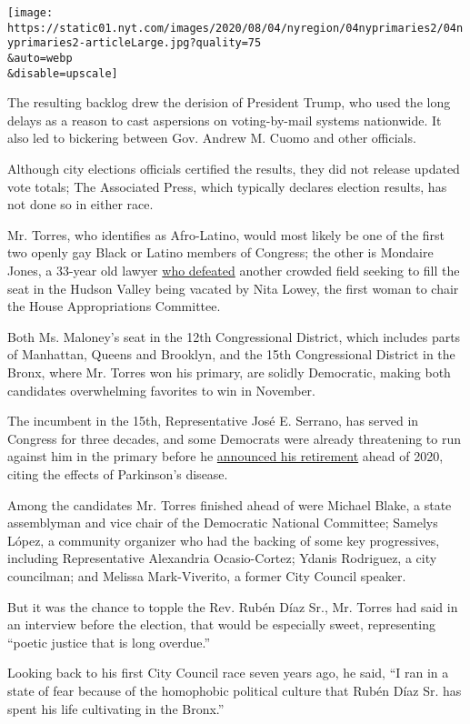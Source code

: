\texttt{[image: https://static01.nyt.com/images/2020/08/04/nyregion/04nyprimaries2/04nyprimaries2-articleLarge.jpg?quality=75\\\&auto=webp\\\&disable=upscale]}

The resulting backlog drew the derision of President Trump, who used the
long delays as a reason to cast aspersions on voting-by-mail systems
nationwide. It also led to bickering between Gov. Andrew M. Cuomo and
other officials.

Although city elections officials certified the results, they did not
release updated vote totals; The Associated Press, which typically
declares election results, has not done so in either race.

Mr. Torres, who identifies as Afro-Latino, would most likely be one of
the first two openly gay Black or Latino members of Congress; the other
is Mondaire Jones, a 33-year old lawyer
\href{https://www.nytimes.com/2020/07/14/nyregion/mondaire-jones-house-primary.html}{who
defeated} another crowded field seeking to fill the seat in the Hudson
Valley being vacated by Nita Lowey, the first woman to chair the House
Appropriations Committee.

Both Ms. Maloney's seat in the 12th Congressional District, which
includes parts of Manhattan, Queens and Brooklyn, and the 15th
Congressional District in the Bronx, where Mr. Torres won his primary,
are solidly Democratic, making both candidates overwhelming favorites to
win in November.

The incumbent in the 15th, Representative José E. Serrano, has served in
Congress for three decades, and some Democrats were already threatening
to run against him in the primary before he
\href{https://www.nytimes.com/2019/03/25/nyregion/jose-serrano-parkinsons-retire.html}{announced
his retirement} ahead of 2020, citing the effects of Parkinson's
disease.

Among the candidates Mr. Torres finished ahead of were Michael Blake, a
state assemblyman and vice chair of the Democratic National Committee;
Samelys López, a community organizer who had the backing of some key
progressives, including Representative Alexandria Ocasio-Cortez; Ydanis
Rodriguez, a city councilman; and Melissa Mark-Viverito, a former City
Council speaker.

But it was the chance to topple the Rev. Rubén Díaz Sr., Mr. Torres had
said in an interview before the election, that would be especially
sweet, representing ``poetic justice that is long overdue.''

Looking back to his first City Council race seven years ago, he said,
``I ran in a state of fear because of the homophobic political culture
that Rubén Díaz Sr. has spent his life cultivating in the Bronx.''

